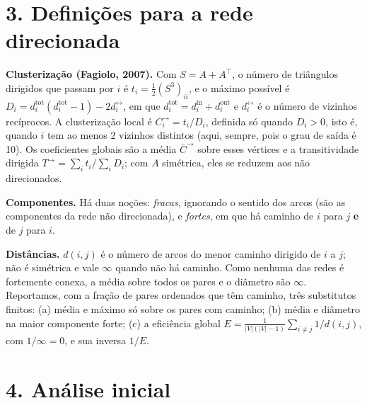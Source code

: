 \documentclass[11pt,a4paper]{article}
\begin{document}
\section*{3. Definições para a rede direcionada}

\textbf{Clusterização (Fagiolo, 2007).} Com $S=A+A^\top$, o número de triângulos
dirigidos que passam por $i$ é $t_i=\tfrac12(S^3)_{ii}$, e o máximo possível é
$D_i=d_i^{\text{tot}}(d_i^{\text{tot}}-1)-2d_i^{\leftrightarrow}$, em que
$d_i^{\text{tot}}=d_i^{\text{in}}+d_i^{\text{out}}$ e $d_i^{\leftrightarrow}$ é o número
de vizinhos recíprocos. A clusterização local é $C_i^{\rightarrow}=t_i/D_i$, definida só
quando $D_i>0$, isto é, quando $i$ tem ao menos 2 vizinhos distintos (aqui, sempre, pois o
grau de saída é 10). Os coeficientes globais são a média $\bar C^{\rightarrow}$ sobre esses
vértices e a transitividade dirigida $T^{\rightarrow}=\sum_i t_i/\sum_i D_i$; com $A$
simétrica, eles se reduzem aos não direcionados.

\textbf{Componentes.} Há duas noções: \textit{fracas}, ignorando o sentido dos arcos (são
as componentes da rede não direcionada), e \textit{fortes}, em que há caminho de $i$ para
$j$ \textbf{e} de $j$ para $i$.

\textbf{Distâncias.} $d(i,j)$ é o número de arcos do menor caminho dirigido de $i$ a $j$;
não é simétrica e vale $\infty$ quando não há caminho. Como nenhuma das redes é fortemente
conexa, a média sobre todos os pares e o diâmetro são $\infty$. Reportamos, com a fração de
pares ordenados que têm caminho, três substitutos finitos: (a) média e máximo só sobre os
pares com caminho; (b) média e diâmetro na maior componente forte; (c) a eficiência global
$E=\frac{1}{|V|(|V|-1)}\sum_{i\neq j}1/d(i,j)$, com $1/\infty=0$, e sua inversa $1/E$.

\section*{4. Análise inicial}

\begin{table}[h]
\centering
\footnotesize
\setlength{\tabcolsep}{3.5pt}
\caption{Métricas das quatro redes direcionadas ($k=10$). Distâncias exatas, por busca em
largura a partir de cada vértice. As duas últimas linhas comparam as redes; o Jaccard é
$|A\cap A'|/|A\cup A'|$, com $A$ os arcos da rede e $A'$ os da coluna anterior.}
\label{tab:metricas}

\end{table}
\end{document}
